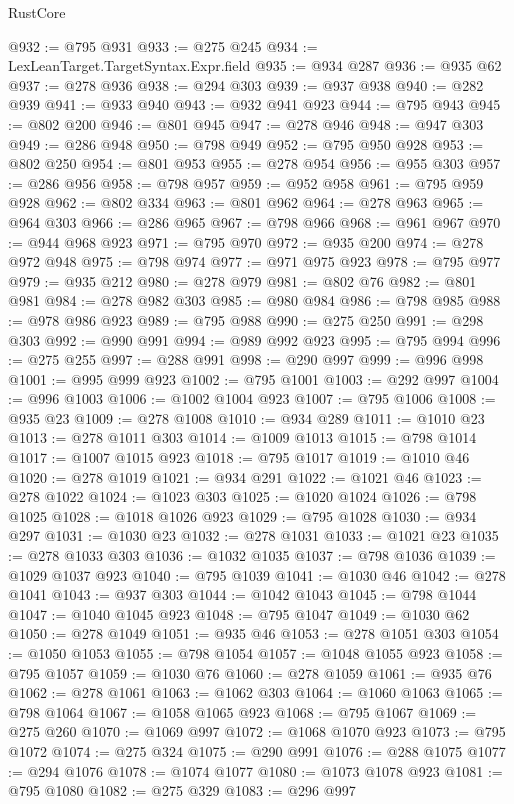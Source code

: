 \begin{lexlean}{RustCore}
\begin{coremodule}
@932 := @795 @931
@933 := @275 @245
@934 := LexLeanTarget.TargetSyntax.Expr.field
@935 := @934 @287
@936 := @935 @62
@937 := @278 @936
@938 := @294 @303
@939 := @937 @938
@940 := @282 @939
@941 := @933 @940
@943 := @932 @941 @923
@944 := @795 @943
@945 := @802 @200
@946 := @801 @945
@947 := @278 @946
@948 := @947 @303
@949 := @286 @948
@950 := @798 @949
@952 := @795 @950 @928
@953 := @802 @250
@954 := @801 @953
@955 := @278 @954
@956 := @955 @303
@957 := @286 @956
@958 := @798 @957
@959 := @952 @958
@961 := @795 @959 @928
@962 := @802 @334
@963 := @801 @962
@964 := @278 @963
@965 := @964 @303
@966 := @286 @965
@967 := @798 @966
@968 := @961 @967
@970 := @944 @968 @923
@971 := @795 @970
@972 := @935 @200
@974 := @278 @972 @948
@975 := @798 @974
@977 := @971 @975 @923
@978 := @795 @977
@979 := @935 @212
@980 := @278 @979
@981 := @802 @76
@982 := @801 @981
@984 := @278 @982 @303
@985 := @980 @984
@986 := @798 @985
@988 := @978 @986 @923
@989 := @795 @988
@990 := @275 @250
@991 := @298 @303
@992 := @990 @991
@994 := @989 @992 @923
@995 := @795 @994
@996 := @275 @255
@997 := @288 @991
@998 := @290 @997
@999 := @996 @998
@1001 := @995 @999 @923
@1002 := @795 @1001
@1003 := @292 @997
@1004 := @996 @1003
@1006 := @1002 @1004 @923
@1007 := @795 @1006
@1008 := @935 @23
@1009 := @278 @1008
@1010 := @934 @289
@1011 := @1010 @23
@1013 := @278 @1011 @303
@1014 := @1009 @1013
@1015 := @798 @1014
@1017 := @1007 @1015 @923
@1018 := @795 @1017
@1019 := @1010 @46
@1020 := @278 @1019
@1021 := @934 @291
@1022 := @1021 @46
@1023 := @278 @1022
@1024 := @1023 @303
@1025 := @1020 @1024
@1026 := @798 @1025
@1028 := @1018 @1026 @923
@1029 := @795 @1028
@1030 := @934 @297
@1031 := @1030 @23
@1032 := @278 @1031
@1033 := @1021 @23
@1035 := @278 @1033 @303
@1036 := @1032 @1035
@1037 := @798 @1036
@1039 := @1029 @1037 @923
@1040 := @795 @1039
@1041 := @1030 @46
@1042 := @278 @1041
@1043 := @937 @303
@1044 := @1042 @1043
@1045 := @798 @1044
@1047 := @1040 @1045 @923
@1048 := @795 @1047
@1049 := @1030 @62
@1050 := @278 @1049
@1051 := @935 @46
@1053 := @278 @1051 @303
@1054 := @1050 @1053
@1055 := @798 @1054
@1057 := @1048 @1055 @923
@1058 := @795 @1057
@1059 := @1030 @76
@1060 := @278 @1059
@1061 := @935 @76
@1062 := @278 @1061
@1063 := @1062 @303
@1064 := @1060 @1063
@1065 := @798 @1064
@1067 := @1058 @1065 @923
@1068 := @795 @1067
@1069 := @275 @260
@1070 := @1069 @997
@1072 := @1068 @1070 @923
@1073 := @795 @1072
@1074 := @275 @324
@1075 := @290 @991
@1076 := @288 @1075
@1077 := @294 @1076
@1078 := @1074 @1077
@1080 := @1073 @1078 @923
@1081 := @795 @1080
@1082 := @275 @329
@1083 := @296 @997

\end{coremodule}
\end{lexlean}
